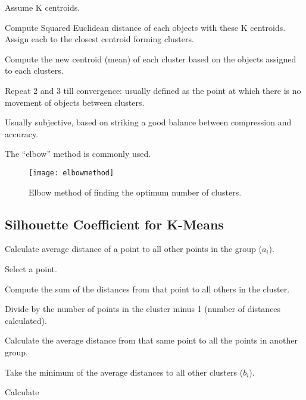 	\begin{numberedlist}
		\item Assume K centroids.
		\item Compute Squared Euclidean distance of each objects with these K centroids. Assign each to the closest centroid forming clusters.
		\item Compute the new centroid (mean) of each cluster based on the objects assigned to each clusters.
		\item Repeat 2 and 3 till convergence: usually defined as the point at which there is no movement of objects between clusters.
	\end{numberedlist}

	\begin{bulletedlist}
		\item Usually subjective, based on striking a good balance between compression and accuracy.
		\item The ``elbow'' method is commonly used.
	\end{bulletedlist}

	\begin{figure}[h]
		\centering
		\texttt{[image: elbowmethod]}
		\caption{Elbow method of finding the optimum number of clusters.}
		\label{fig:elbowmethod}
	\end{figure}

	\subsection{Silhouette Coefficient for K-Means}
	\begin{numberedlist}
		\item Calculate average distance of a point to all other points in the group ($a_i$).
			\begin{numberedlist}
				\item Select a point.
				\item Compute the sum of the distances from that point to all others in the cluster.
				\item Divide by the number of points in the cluster minus 1 (number of distances calculated).
			\end{numberedlist}
		\item Calculate the average distance from that same point to all the points in another group.
		\item Take the minimum of the average distances to all other clusters ($b_i$).
		\item Calculate
	\end{numberedlist}

